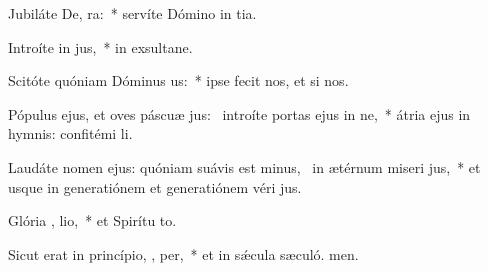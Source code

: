 \item Jubiláte De,  ra:~* servíte Dómino in tia.
\item Introíte in  jus,~* in exsultane.
\item Scitóte quóniam Dóminus   us:~* ipse fecit nos, et  si nos.
\item Pópulus ejus, et oves páscuæ jus:~\pscross{} introíte portas ejus in ne,~* átria ejus in hymnis: confitémi li.
\item Laudáte nomen ejus: quóniam suávis est minus,~\pscross{} in ætérnum miseri jus,~* et usque in generatiónem et generatiónem véri jus.
\item Glória ,  lio,~* et Spirítu to.
\item Sicut erat in princípio,  ,  per,~* et in sǽcula sæculó. men.
